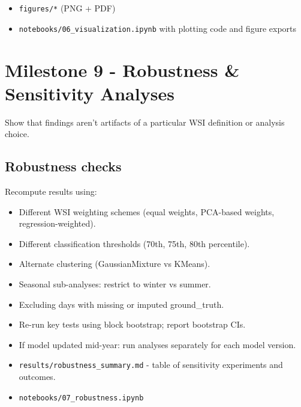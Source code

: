 \documentclass[11pt,a4paper]{article}
\begin{document}
\begin{deliverablebox}
\begin{itemize}
    \item \texttt{figures/*} (PNG + PDF)
    \item \texttt{notebooks/06\_visualization.ipynb} with plotting code and figure exports
\end{itemize}
\end{deliverablebox}

\section{Milestone 9 - Robustness \& Sensitivity Analyses}

\begin{objectivebox}
Show that findings aren't artifacts of a particular WSI definition or analysis choice.
\end{objectivebox}

\subsection{Robustness checks}

Recompute results using:
\begin{itemize}
    \item Different WSI weighting schemes (equal weights, PCA-based weights, regression-weighted).
    \item Different classification thresholds (70th, 75th, 80th percentile).
    \item Alternate clustering (GaussianMixture vs KMeans).
    \item Seasonal sub-analyses: restrict to winter vs summer.
    \item Excluding days with missing or imputed ground\_truth.
    \item Re-run key tests using block bootstrap; report bootstrap CIs.
    \item If model updated mid-year: run analyses separately for each model version.
\end{itemize}

\begin{deliverablebox}
\begin{itemize}
    \item \texttt{results/robustness\_summary.md} - table of sensitivity experiments and outcomes.
    \item \texttt{notebooks/07\_robustness.ipynb}
\end{itemize}
\end{deliverablebox}
\end{document}

